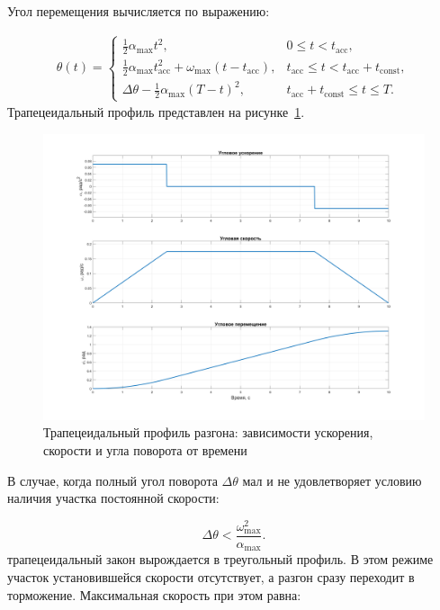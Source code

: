 Угол перемещения вычисляется по выражению:

\begin{equation}
	\begin{split}
		\label{eq:theta_function}
		\theta(t) =
		\begin{cases}
			\frac{1}{2}\alpha_{\max} t^{2}, & 0 \leq t < t_{\mathrm{acc}},\\[6pt]
			\frac{1}{2}\alpha_{\max} t_{\mathrm{acc}}^{2} + \omega_{\max}(t - t_{\mathrm{acc}}), 
			& t_{\mathrm{acc}} \leq t < t_{\mathrm{acc}} + t_{\mathrm{const}},\\[6pt]
			\Delta\theta - \frac{1}{2}\alpha_{\max}(T - t)^{2}, 
			& t_{\mathrm{acc}} + t_{\mathrm{const}} \leq t \leq T.
		\end{cases}
	\end{split}
\end{equation}
Трапецеидальный профиль представлен на рисунке~\cref{fig:line-profile}. 

\begin{figure}[h!]
	\centering
	\includegraphics[scale=0.3]{matlab/img/line_profile.png}
	\caption{Трапецеидальный профиль разгона: зависимости ускорения, скорости и угла поворота от времени}
	\label{fig:line-profile}
\end{figure}

В случае, когда полный угол поворота $\Delta \theta$ мал и не удовлетворяет условию наличия участка постоянной скорости:

\begin{equation}
	\Delta \theta < \frac{\omega_{\max}^2}{\alpha_{\max}}.
\end{equation}
трапецеидальный закон вырождается в треугольный профиль. В этом режиме участок установившейся скорости отсутствует, а разгон сразу переходит в торможение. Максимальная скорость при этом равна:

